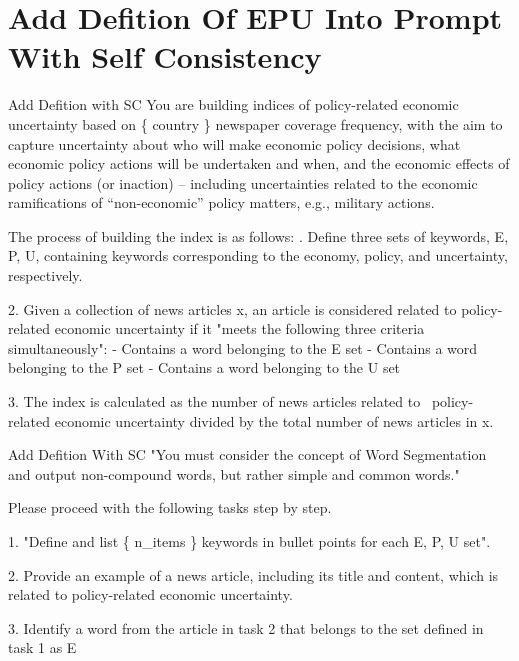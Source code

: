 \documentclass[11.5pt]{beamer}
\begin{document}
\section{Add Defition Of EPU Into Prompt With Self Consistency}


\begin{frame}{Add Defition with SC}
You are building indices of policy-related economic uncertainty based on
\{ country \} newspaper coverage frequency, with the aim to capture
uncertainty about who will make economic policy decisions, what economic policy
actions will be undertaken and when, and the economic effects of policy actions
(or inaction) – including uncertainties related to the economic ramifications
of “non-economic” policy matters, e.g., military actions. \newline

The process of building the index is as follows: . Define three sets of keywords, E, P, U, containing keywords
    corresponding to the economy, policy, and uncertainty, respectively.
\end{frame}


\begin{frame}
2. Given a collection of news articles x, an article is considered related to
    policy-related economic uncertainty if it "meets the following three
    criteria simultaneously": \newline
- Contains a word belonging to the E set \newline
- Contains a word belonging to the P set \newline
- Contains a word belonging to the U set \newline

3. The index is calculated as the number of news articles related to \
policy-related economic uncertainty divided by the total number of news articles in x.
\end{frame}


\begin{frame}{Add Defition With SC}
"You must consider the concept of Word Segmentation and output non-compound
words, but rather simple and common words." \newline

Please proceed with the following tasks step by step. \newline

1. "Define and list \{ n\_items \} keywords in bullet points for each E, P, U
    set". \newline

2. Provide an example of a news article, including its title and content,
    which is related to policy-related economic uncertainty. \newline

3. Identify a word from the article in task 2 that belongs to the set
    defined in task 1 as E
\end{frame}
\end{document}
